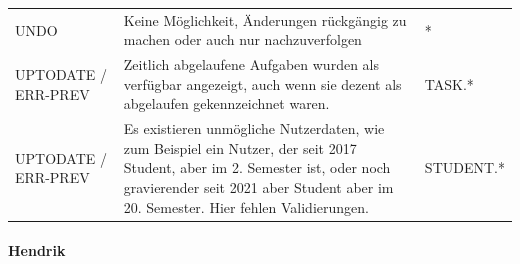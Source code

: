 \documentclass[
  12pt,
  ngerman,
  a4paper,
]{article}
\let\oldparagraph\paragraph
\renewcommand{\paragraph}[1]{\oldparagraph{#1}\mbox{}}
\begin{document}
\begin{longtable}[]{@{}lll@{}}
\begin{minipage}[t]{0.22\columnwidth}
UNDO\strut
\end{minipage} & \begin{minipage}[t]{0.52\columnwidth}\raggedright
Keine Möglichkeit, Änderungen rückgängig zu machen oder auch nur
nachzuverfolgen\strut
\end{minipage} & \begin{minipage}[t]{0.17\columnwidth}\raggedright
*\strut
\end{minipage}\tabularnewline
\begin{minipage}[t]{0.22\columnwidth}\raggedright
UPTODATE / ERR-PREV\strut
\end{minipage} & \begin{minipage}[t]{0.52\columnwidth}\raggedright
Zeitlich abgelaufene Aufgaben wurden als verfügbar angezeigt, auch wenn
sie dezent als abgelaufen gekennzeichnet waren.\strut
\end{minipage} & \begin{minipage}[t]{0.17\columnwidth}\raggedright
TASK.*\strut
\end{minipage}\tabularnewline
\begin{minipage}[t]{0.22\columnwidth}\raggedright
UPTODATE / ERR-PREV\strut
\end{minipage} & \begin{minipage}[t]{0.52\columnwidth}\raggedright
Es existieren unmögliche Nutzerdaten, wie zum Beispiel ein Nutzer, der
seit 2017 Student, aber im 2. Semester ist, oder noch gravierender seit
2021 aber Student aber im 20. Semester. Hier fehlen Validierungen.\strut
\end{minipage} & \begin{minipage}[t]{0.17\columnwidth}\raggedright
STUDENT.*\strut
\end{minipage}\tabularnewline
\bottomrule
\end{longtable}

\hypertarget{hendrik}{%
\paragraph{Hendrik}\label{hendrik}}
\end{document}
